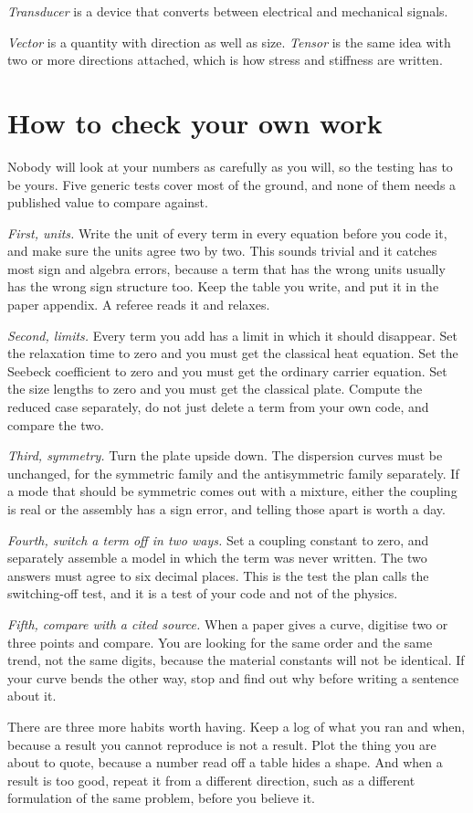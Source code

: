 \documentclass[11pt]{article}
\begin{document}
\textit{Transducer} is a device that converts between electrical and mechanical signals.

\textit{Vector} is a quantity with direction as well as size. \textit{Tensor} is the same idea with two or more
directions attached, which is how stress and stiffness are written.

\section{How to check your own work}

Nobody will look at your numbers as carefully as you will, so the testing has to be yours. Five generic tests
cover most of the ground, and none of them needs a published value to compare against.

\textit{First, units.} Write the unit of every term in every equation before you code it, and make sure the
units agree two by two. This sounds trivial and it catches most sign and algebra errors, because a term that
has the wrong units usually has the wrong sign structure too. Keep the table you write, and put it in the
paper appendix. A referee reads it and relaxes.

\textit{Second, limits.} Every term you add has a limit in which it should disappear. Set the relaxation time
to zero and you must get the classical heat equation. Set the Seebeck coefficient to zero and you must get the
ordinary carrier equation. Set the size lengths to zero and you must get the classical plate. Compute the
reduced case separately, do not just delete a term from your own code, and compare the two.

\textit{Third, symmetry.} Turn the plate upside down. The dispersion curves must be unchanged, for the
symmetric family and the antisymmetric family separately. If a mode that should be symmetric comes out with a
mixture, either the coupling is real or the assembly has a sign error, and telling those apart is worth a day.

\textit{Fourth, switch a term off in two ways.} Set a coupling constant to zero, and separately assemble a
model in which the term was never written. The two answers must agree to six decimal places. This is the test
the plan calls the switching-off test, and it is a test of your code and not of the physics.

\textit{Fifth, compare with a cited source.} When a paper gives a curve, digitise two or three points and
compare. You are looking for the same order and the same trend, not the same digits, because the material
constants will not be identical. If your curve bends the other way, stop and find out why before writing a
sentence about it.

There are three more habits worth having. Keep a log of what you ran and when, because a result you cannot
reproduce is not a result. Plot the thing you are about to quote, because a number read off a table hides a
shape. And when a result is too good, repeat it from a different direction, such as a different formulation of
the same problem, before you believe it.
\end{document}
